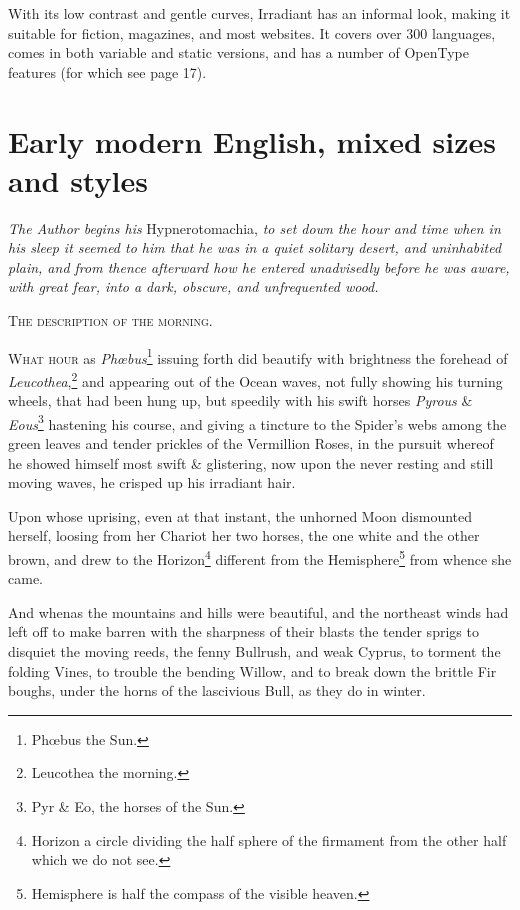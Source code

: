 \documentclass[12pt]{book}
\begin{document}
With its low contrast and gentle curves, Irradiant has an informal look, 
making it suitable for fiction, magazines, and most websites.
It covers over 300 languages, comes in both variable and static versions,
and has a number of OpenType features (for which see page 17).

\section*{Early modern English, mixed sizes and styles}

{\large\noindent\textit{The Author begins his} Hypnerotomachia, \textit{to set
  down the hour and time when in his sleep it seemed to him that
  he was in a quiet solitary desert, and uninhabited plain, and
  from thence afterward how he entered unadvisedly before he was
  aware, with great fear, into a dark, obscure, and unfrequented
  wood.}}

\begin{center}
  \textsc{The description of the morning.}
\end{center}

\lettrine[lines=5, loversize=0.1, findent=5pt, nindent=0em, image=true]{W}{hat hour} as \textit{Phœbus}\footnote{Phœbus the Sun.} issuing
forth did beautify with brightness the forehead of
\textit{Leucothea},\footnote{Leucothea the morning.} and appearing out
of the Ocean waves, not fully showing his turning wheels, that had
been hung up, but speedily with his swift horses \textit{Pyrous} \&
\textit{Eous}\footnote{Pyr \& Eo, the horses of the Sun.} hastening
his course, and giving a tincture to the Spider’s webs among the
green leaves and tender prickles of the Vermillion Roses, in the
pursuit whereof he showed himself most swift \& glistering, now upon
the never resting and still moving waves, he crisped up his irradiant
hair.

Upon whose uprising, even at that instant, the unhorned Moon
dismounted herself, loosing from her Chariot her two horses, the one
white and the other brown, and drew to the Horizon\footnote{Horizon
  a circle dividing the half sphere of the firmament from the other
  half which we do not see.} different from the
Hemisphere\footnote{Hemisphere is half the compass of the visible
  heaven.} from whence she came.

And whenas the mountains and hills were beautiful, and the
northeast winds had left off to make barren with the sharpness of
their blasts the tender sprigs to disquiet the moving reeds, the
fenny Bullrush, and weak Cyprus, to torment the folding Vines, to
trouble the bending Willow, and to break down the brittle Fir
boughs, under the horns of the lascivious Bull, as they do in
winter.
\end{document}
